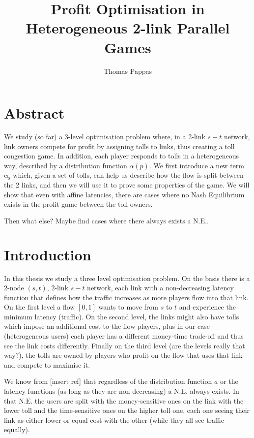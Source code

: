 \documentclass[a4paper,11pt]{article}
\newcommand{\NE}{\mathrm{N.E.}}
\newcommand{\as}{\mathrm{\alpha_s}}
\begin{document}
\title{Profit Optimisation in Heterogeneous 2-link Parallel Games}
\author{Thomas Pappas}
\date{}
\maketitle

\section*{Abstract}
We study (so far) a 3-level optimisation problem where, in a 2-link $s-t$ network, link owners compete for profit by assigning tolls to links, thus creating a toll congestion game.
In addition, each player responds to tolls in a heterogeneous way, described by a distribution function $\alpha(p)$.
We first introduce a new term $\as$ which, given a set of tolls, can help us describe how the flow is split between the 2 links, and then we will use it to prove some properties of the game.
We will show that even with affine latencies, there are cases where no Nash Equilibrium exists in the profit game between the toll owners.

Then what else? Maybe find cases where there always exists a $\NE$.


\section{Introduction}

In this thesis we study a three level optimisation problem.
On the basis there is a 2-node $(s, t)$, 2-link $s-t$ network, each link with a non-decreasing latency function that defines how the traffic increases as more players flow into that link.
On the first level a flow $[0, 1]$ wants to move from $s$ to $t$ and experience the minimum latency (traffic).
On the second level, the links might also have tolls which impose an additional cost to the flow players, plus in our case (heterogeneous users) each player has a different money-time trade-off and thus see the link costs differently.
Finally on the third level (are the levels really that way?), the tolls are owned by players who profit on the flow that uses that link and compete to maximise it.

We know from [insert ref] that regardless of the distribution function $a$ or the latency functions (as long as they are non-decreasing) a $\NE$ always exists.
In that $\NE$ the users are split with the money-sensitive ones on the link with the lower toll and the time-sensitive ones on the higher toll one, each one seeing their link as either lower or equal cost with the other (while they all see traffic equally).
\end{document}
